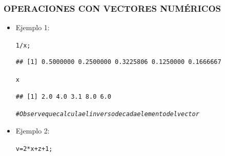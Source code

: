 \documentclass[12pt,letterpaper]{article}\usepackage[]{graphicx}\usepackage[]{color}
\makeatletter
\newcommand{\hlnum}[1]{\textcolor[rgb]{0.686,0.059,0.569}{#1}}%
\newcommand{\hlcom}[1]{\textcolor[rgb]{0.678,0.584,0.686}{\textit{#1}}}%
\newcommand{\hlopt}[1]{\textcolor[rgb]{0,0,0}{#1}}%
\newcommand{\hlstd}[1]{\textcolor[rgb]{0.345,0.345,0.345}{#1}}%
\newcommand{\hlkwb}[1]{\textcolor[rgb]{0.69,0.353,0.396}{#1}}%
\newenvironment{kframe}{%
 \def\at@end@of@kframe{}%
 \ifinner\ifhmode%
  \def\at@end@of@kframe{\end{minipage}}%
  \begin{minipage}{\columnwidth}%
 \fi\fi%
 \def\FrameCommand##1{\hskip\@totalleftmargin \hskip-\fboxsep
 \colorbox{shadecolor}{##1}\hskip-\fboxsep
     \hskip-\linewidth \hskip-\@totalleftmargin \hskip\columnwidth}%
 \MakeFramed {\advance\hsize-\width
   \@totalleftmargin\z@ \linewidth\hsize
   \@setminipage}}%
 {\par\unskip\endMakeFramed%
 \at@end@of@kframe}
\newenvironment{knitrout}{}{} %
\makeatother
\begin{document}
\subsubsection{OPERACIONES CON VECTORES NUM\'ERICOS}
\begin{itemize}
\item Ejemplo 1:
\begin{knitrout}
\color{fgcolor}\begin{kframe}
\begin{alltt}
\hlnum{1}\hlopt{/}\hlstd{x;}
\end{alltt}
\begin{verbatim}
## [1] 0.5000000 0.2500000 0.3225806 0.1250000 0.1666667
\end{verbatim}
\begin{alltt}
\hlstd{x}
\end{alltt}
\begin{verbatim}
## [1] 2.0 4.0 3.1 8.0 6.0
\end{verbatim}
\begin{alltt}
\hlcom{# Observe que calcula el inverso de cada elemento del vector}
\end{alltt}
\end{kframe}
\end{knitrout}
\item Ejemplo 2:
\begin{knitrout}
\color{fgcolor}\begin{kframe}
\begin{alltt}
\hlstd{v}\hlkwb{=}\hlnum{2}\hlopt{*}\hlstd{x}\hlopt{+}\hlstd{z}\hlopt{+}\hlnum{1}\hlstd{;}
\end{alltt}



\end{kframe}
\end{knitrout}
\end{itemize}
\end{document}
